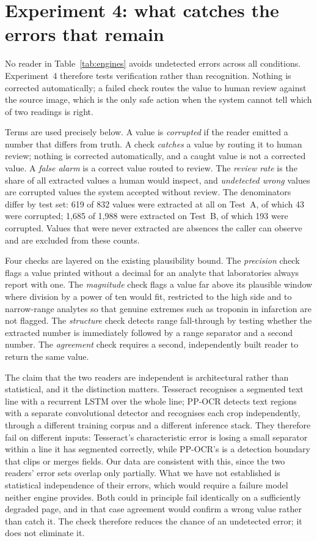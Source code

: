 \documentclass[11pt]{article}
\begin{document}
\section{Experiment 4: what catches the errors that remain}

No reader in Table~\ref{tab:engines} avoids undetected errors across all conditions.
Experiment~4 therefore tests
verification rather than recognition. Nothing is corrected automatically; a failed check routes
the value to human review against the source image, which is the only safe action when the
system cannot tell which of two readings is right.

Terms are used precisely below. A value is \emph{corrupted} if the reader emitted a number that
differs from truth. A check \emph{catches} a value by routing it to human review; nothing is
corrected automatically, and a caught value is not a corrected value. A \emph{false alarm} is a
correct value routed to review. The \emph{review rate} is the share of all extracted values a
human would inspect, and \emph{undetected wrong} values are corrupted values the system accepted
without review. The denominators differ by test set: 619 of 832 values were extracted at all on
Test~A, of which 43 were corrupted; 1{,}685 of 1{,}988 were extracted on Test~B, of which 193
were corrupted. Values that were never extracted are absences the caller can observe and are
excluded from these counts.

Four checks are layered on the existing plausibility bound. The \emph{precision} check flags a
value printed without a decimal for an analyte that laboratories always report with one. The
\emph{magnitude} check flags a value far above its plausible window where division by a power of
ten would fit, restricted to the high side and to narrow-range analytes so that genuine extremes
such as troponin in infarction are not flagged. The \emph{structure} check detects range
fall-through by testing whether the extracted number is immediately followed by a range
separator and a second number. The \emph{agreement} check requires a second, independently built
reader to return the same value.

The claim that the two readers are independent is architectural rather than statistical, and it
the distinction matters. Tesseract recognises a segmented text line with
a recurrent LSTM over the whole line; PP-OCR detects text regions with a separate convolutional
detector and recognises each crop independently, through a different training corpus and a
different inference stack. They therefore fail on different inputs: Tesseract's characteristic
error is losing a small separator within a line it has segmented correctly, while PP-OCR's is a
detection boundary that clips or merges fields. Our data are consistent with this, since the two
readers' error sets overlap only partially. What we have not established is statistical
independence of their errors, which would require a failure model neither engine provides. Both
could in principle fail identically on a sufficiently degraded page, and in that case agreement
would confirm a wrong value rather than catch it. The check therefore reduces the chance of an
undetected error; it does not eliminate it.
\end{document}
